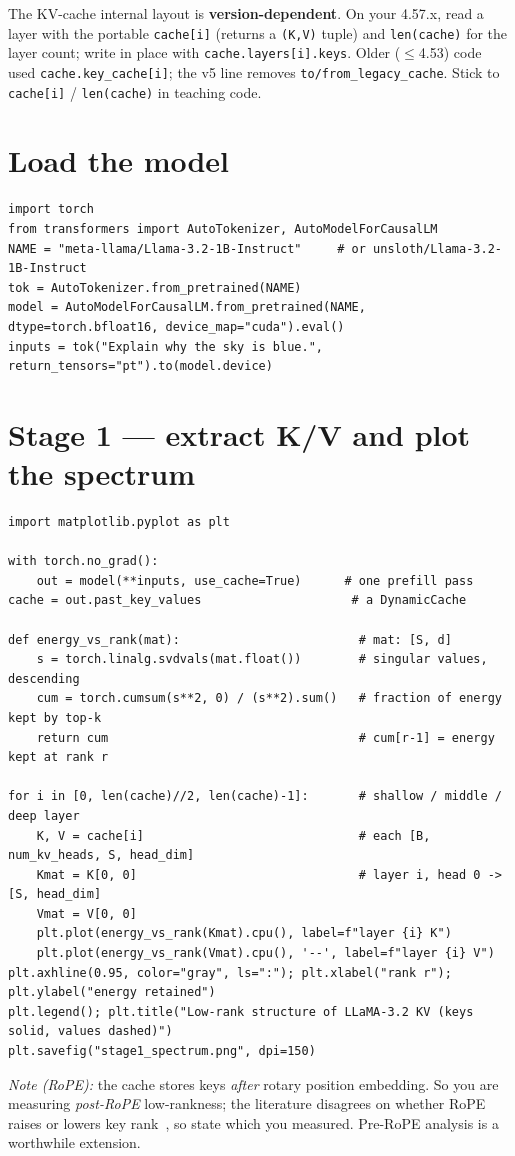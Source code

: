 \documentclass[11pt]{article}
\newcommand{\code}[1]{\texttt{\small #1}}
\begin{document}
\begin{pitfall}
The KV-cache internal layout is \textbf{version-dependent}. On your 4.57.x, read a layer with the
portable \code{cache[i]} (returns a \code{(K,V)} tuple) and \code{len(cache)} for the layer count;
write in place with \code{cache.layers[i].keys}. Older ($\le$4.53) code used
\code{cache.key\_cache[i]}; the v5 line removes \code{to/from\_legacy\_cache}. Stick to
\code{cache[i]} / \code{len(cache)} in teaching code.
\end{pitfall}

\section{Load the model}
\begin{lstlisting}
import torch
from transformers import AutoTokenizer, AutoModelForCausalLM
NAME = "meta-llama/Llama-3.2-1B-Instruct"     # or unsloth/Llama-3.2-1B-Instruct
tok = AutoTokenizer.from_pretrained(NAME)
model = AutoModelForCausalLM.from_pretrained(NAME, dtype=torch.bfloat16, device_map="cuda").eval()
inputs = tok("Explain why the sky is blue.", return_tensors="pt").to(model.device)
\end{lstlisting}

\section{Stage 1 --- extract K/V and plot the spectrum}
\begin{lstlisting}
import matplotlib.pyplot as plt

with torch.no_grad():
    out = model(**inputs, use_cache=True)      # one prefill pass
cache = out.past_key_values                     # a DynamicCache

def energy_vs_rank(mat):                         # mat: [S, d]
    s = torch.linalg.svdvals(mat.float())        # singular values, descending
    cum = torch.cumsum(s**2, 0) / (s**2).sum()   # fraction of energy kept by top-k
    return cum                                   # cum[r-1] = energy kept at rank r

for i in [0, len(cache)//2, len(cache)-1]:       # shallow / middle / deep layer
    K, V = cache[i]                              # each [B, num_kv_heads, S, head_dim]
    Kmat = K[0, 0]                               # layer i, head 0 -> [S, head_dim]
    Vmat = V[0, 0]
    plt.plot(energy_vs_rank(Kmat).cpu(), label=f"layer {i} K")
    plt.plot(energy_vs_rank(Vmat).cpu(), '--', label=f"layer {i} V")
plt.axhline(0.95, color="gray", ls=":"); plt.xlabel("rank r"); plt.ylabel("energy retained")
plt.legend(); plt.title("Low-rank structure of LLaMA-3.2 KV (keys solid, values dashed)")
plt.savefig("stage1_spectrum.png", dpi=150)
\end{lstlisting}
\emph{Note (RoPE):} the cache stores keys \emph{after} rotary position embedding. So you are
measuring \emph{post-RoPE} low-rankness; the literature disagrees on whether RoPE raises or lowers
key rank~\cite{shadowkv}, so state which you measured. Pre-RoPE analysis is a worthwhile extension.
\end{document}
